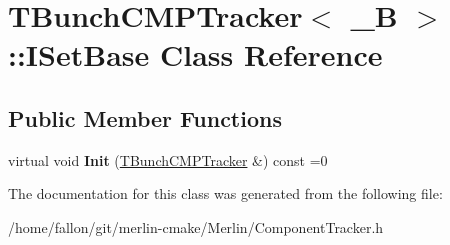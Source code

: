 \hypertarget{classTBunchCMPTracker_1_1ISetBase}{}\section{T\+Bunch\+C\+M\+P\+Tracker$<$ \+\_\+B $>$\+:\+:I\+Set\+Base Class Reference}
\label{classTBunchCMPTracker_1_1ISetBase}
\subsection*{Public Member Functions}
\begin{DoxyCompactItemize}
\item 
\mbox{\label{classTBunchCMPTracker_1_1ISetBase_af1d306ff9e77bbc068a19a0d41514551}} 
virtual void {\bfseries Init} (\hyperlink{classTBunchCMPTracker}{T\+Bunch\+C\+M\+P\+Tracker} \&) const =0
\end{DoxyCompactItemize}


The documentation for this class was generated from the following file\+:\begin{DoxyCompactItemize}
\item 
/home/fallon/git/merlin-\/cmake/\+Merlin/Component\+Tracker.\+h\end{DoxyCompactItemize}
